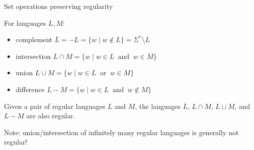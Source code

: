\documentclass[handout]{beamer}
\begin{document}
\begin{frame}{Set operations preserving regularity}

    For languages $L, M$:
    \begin{itemize}
        \item \alert{complement} $\overline{L}= -L=\{w\mid w\notin L\}=\Sigma^*\setminus L$
        \item \alert{intersection} $L\cap M=\{w\mid w\in L\ \text{ and }\ w\in M\}$
        \item \alert{union} $L\cup M=\{w\mid w\in L\ \text{ or }\  w\in M\}$
        \item \alert{difference} $L- M=\{w\mid w\in L \ \text{ and }\  w\notin M\}$
    \end{itemize}

    \begin{theorem}
        Given a pair of regular languages $L$ and $M$, the languages $\overline{L}$, $L\cap M$, $L\cup M$, and $L- M$ are also regular.
    \end{theorem}

    Note: union/intersection of \alert{infinitely many} regular languages is generally not regular!


\end{frame}
\end{document}
